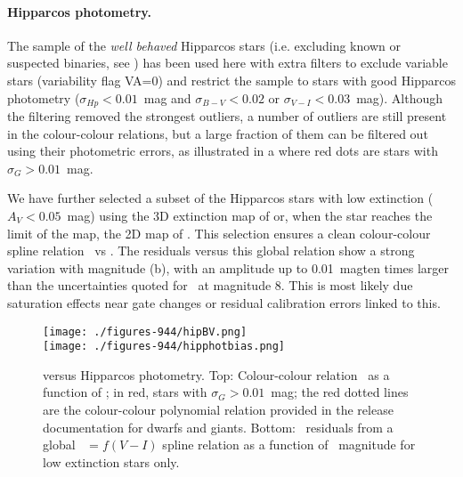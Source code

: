 \paragraph{Hipparcos photometry.} The sample of the {\it well behaved} Hipparcos stars (i.e. excluding known or suspected binaries, see ) has been used here with extra filters to exclude variable stars (variability flag VA=0) and restrict the sample to stars with good Hipparcos photometry ($\sigma_{Hp}<0.01$~mag and $\sigma_{B-V}<0.02$ or $\sigma_{V-I}<0.03$~mag). Although the {} filtering removed the strongest outliers, a number of outliers are still present in the colour-colour relations, but a large fraction of them can be filtered out using their photometric errors, as illustrated in a where red dots are stars with $\sigma_G>0.01$~mag.

We have further selected a subset of the Hipparcos stars with low extinction ($A_V<0.05$~mag) using the 3D extinction map of \cite{Puspitarini14} or, when the star reaches the limit of the map, the 2D map of \cite{Schlegel98}. This selection ensures a clean colour-colour spline relation \gmhp\ vs \vmi. The residuals versus this global relation show a strong variation with magnitude (b), with an amplitude up to 0.01~magten times larger than the uncertainties quoted for \gmag~at magnitude 8. This is most likely due saturation effects near gate changes or residual calibration errors linked to this. 

\begin{figure}
 \begin{center}
\texttt{[image: ./figures-944/hipBV.png]} \\
\vspace{0.5cm}
\texttt{[image: ./figures-944/hipphotbias.png]} 
\end{center}
\caption[Gaia versus Hipparcos photometry]{{} versus Hipparcos photometry. Top: Colour-colour relation \gmhp~as a function of \bmv; in red, stars with $\sigma_G>0.01$~mag; the red dotted lines are the colour-colour polynomial relation provided in the release documentation for dwarfs and giants. 
Bottom: \gmhp\ residuals from a global \gmhp\ $=f(V-I)$ spline relation as a function of \gmag~magnitude for low extinction stars only.
}
\label{fig:wp944_hipphot}
\end{figure}

